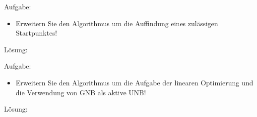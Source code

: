 \begin{uea}
Aufgabe: 
\begin{itemize}
  \item[] Erweitern Sie den Algorithmus um die Auffindung eines zulässigen Startpunktes!
\end{itemize}
Lösung: 
\end{uea}

\begin{uea}
Aufgabe: 
\begin{itemize}
  \item[] Erweitern Sie den Algorithmus um die Aufgabe der linearen Optimierung und die Verwendung von GNB als aktive UNB!
\end{itemize}
Lösung: 
\end{uea}
